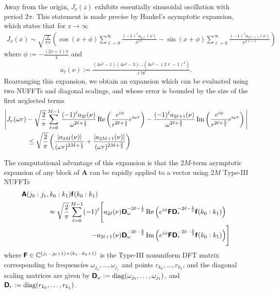 Away from the origin, $J_\nu(z)$ exhibits essentially sinusoidal oscillation
with period $2\pi$. This statement is made precise by Hankel's asymptotic
expansion, which states that for $z \to \infty$
\begin{align} \label{eq:asymptotic-expansion}
    J_\nu(x)
    \sim \sqrt{\frac{2}{\pi x}} \left( 
        \cos\left(x + \phi\right) \sum_{\ell=0}^{\infty} \frac{(-1)^\ell a_{2\ell}(\nu)}{x^{2\ell}}
        - \sin\left(x + \phi\right) \sum_{\ell=0}^{\infty} \frac{(-1)^\ell a_{2\ell+1}(\nu)}{x^{2\ell+1}}
        \right)
\end{align}
where $\phi := - \frac{(2\nu+1)\pi}{4}$ and 
\begin{align}
    a_\ell(\nu) := \frac{(4\nu^2 - 1)(4\nu^2 - 3)\dots(4\nu^2 - (2\ell-1)^2)}{\ell! 8^\ell}.
\end{align}
Rearranging this expansion, we obtain an expansion which can be evaluated using
two NUFFTs and diagonal scalings, and whose error is bounded by the size of the
first neglected terms \todocite
\begin{align}
    & \Bigg| J_\nu(\omega r)
    - \sqrt{\frac{2}{\pi}} \sum_{\ell=0}^{M-1} 
        \frac{(-1)^\ell a_{2\ell}(\nu)}{\omega^{2\ell + \frac{1}{2}}} \Re\left( \frac{e^{i\phi}}{r^{2\ell+\frac{1}{2}}} e^{i\omega r}\right)
        - \frac{(-1)^\ell a_{2\ell+1}(\nu)}{\omega^{2\ell+\frac{3}{2}}} \Im\left(\frac{e^{i\phi}}{r^{2\ell+\frac{3}{2}}} e^{i\omega r} \right)
        \Bigg| \\
        &\hspace*{0.1\textwidth} \leq \sqrt{\frac{2}{\pi}} \left( \frac{\abs{a_{2M}(\nu)}}{(\omega r)^{2M+\frac{1}{2}}} + \frac{\abs{a_{2M+1}(\nu)}}{(\omega r)^{2M+\frac{3}{2}}} \right)
\end{align}

The computational advantage of this expansion is that the $2M$-term asymptotic
expansion of any block of $\bm{A}$ can be rapidly applied to a vector using $2M$
Type-III NUFFTs
\begin{align}
    \mtx{A}(j_0:j_1, k_0:k_1) \vct{f}(k_0:k_1) \hspace*{0.2\textwidth}& \\
    \approx \sqrt{\frac{2}{\pi}} \sum_{\ell=0}^{M-1} (-1)^\ell \Bigg[ 
        a_{2\ell}(\nu) \mtx{D}_\omega^{-2\ell-\frac{1}{2}} &\Re\Big(e^{i\phi} \mtx{F} \mtx{D}_r^{-2\ell-\frac{1}{2}} \vct{f}(k_0:k_1)\Big) \\
        - a_{2\ell+1}(\nu) \mtx{D}_\omega^{-2\ell-\frac{3}{2}} &\Im\Big(e^{i\phi} \mtx{F} \mtx{D}_r^{-2\ell-\frac{3}{2}} \vct{f}(k_0:k_1)\Big) 
    \Bigg]
\end{align}
where $\bm{\mathsf{F}} \in \mathbb{C}^{(j_1 - j_0 + 1) \times (k_1 - k_0 + 1)}$ is the Type-III
nonuniform DFT matrix corresponding to frequencies $\omega_{j_0}, \dots,
\omega_{j_1}$ and points $r_{k_0}, \dots, r_{k_1}$, and the diagonal scaling
matrices are given by $\bm{\mathsf{D}}_\omega :=
\operatorname{diag}(\omega_{j_0},\dots,\omega_{j_1})$, and $\bm{\mathsf{D}}_r :=
\operatorname{diag}(r_{k_0},\dots,r_{k_1})$.

